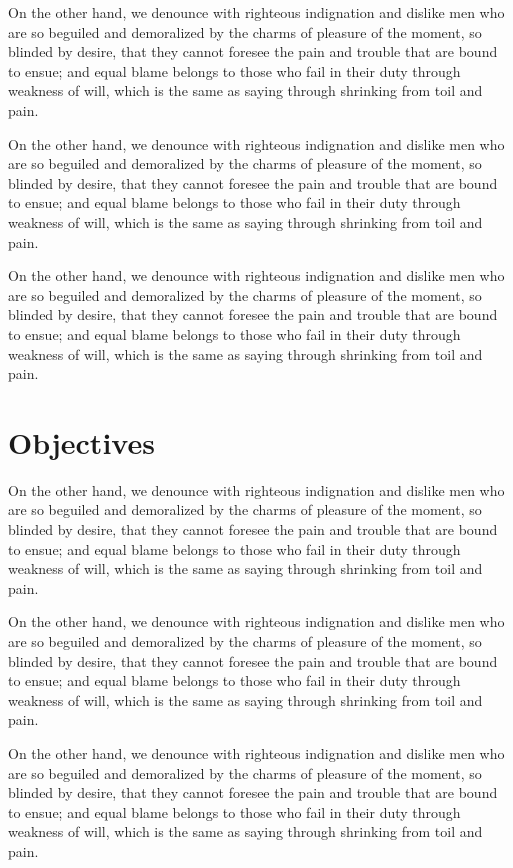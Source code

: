 On the other hand, we denounce with righteous indignation and dislike men who
are so beguiled and demoralized by the charms of pleasure of the moment, so
blinded by desire, that they cannot foresee the pain and trouble that are bound
to ensue; and equal blame belongs to those who fail in their duty through
weakness of will, which is the same as saying through shrinking from toil and
pain.

On the other hand, we denounce with righteous indignation and dislike men who
are so beguiled and demoralized by the charms of pleasure of the moment, so
blinded by desire, that they cannot foresee the pain and trouble that are bound
to ensue; and equal blame belongs to those who fail in their duty through
weakness of will, which is the same as saying through shrinking from toil and
pain.

On the other hand, we denounce with righteous indignation and dislike men who
are so beguiled and demoralized by the charms of pleasure of the moment, so
blinded by desire, that they cannot foresee the pain and trouble that are bound
to ensue; and equal blame belongs to those who fail in their duty through
weakness of will, which is the same as saying through shrinking from toil and
pain.


\section{Objectives}

On the other hand, we denounce with righteous indignation and dislike men who
are so beguiled and demoralized by the charms of pleasure of the moment, so
blinded by desire, that they cannot foresee the pain and trouble that are bound
to ensue; and equal blame belongs to those who fail in their duty through
weakness of will, which is the same as saying through shrinking from toil and
pain.

On the other hand, we denounce with righteous indignation and dislike men who
are so beguiled and demoralized by the charms of pleasure of the moment, so
blinded by desire, that they cannot foresee the pain and trouble that are bound
to ensue; and equal blame belongs to those who fail in their duty through
weakness of will, which is the same as saying through shrinking from toil and
pain.

On the other hand, we denounce with righteous indignation and dislike men who
are so beguiled and demoralized by the charms of pleasure of the moment, so
blinded by desire, that they cannot foresee the pain and trouble that are bound
to ensue; and equal blame belongs to those who fail in their duty through
weakness of will, which is the same as saying through shrinking from toil and
pain.

